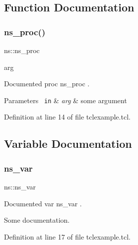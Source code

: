 \subsection{Function Documentation}
\mbox{\label{namespacens_a1429cbe84d32b17ea4783e5c5c00615b}} 
\subsubsection{\texorpdfstring{ns\_proc()}{ns\_proc()}}
{\footnotesize\ttfamily ns\+::ns\+\_\+proc\begin{DoxyParamCaption}\item[{}]{arg  }\end{DoxyParamCaption}}



Documented proc {\ttfamily ns\+\_\+proc} . 


\begin{DoxyParams}[1]{Parameters}
\mbox{\texttt{ in}}  & {\em arg} & some argument \\
\hline
\end{DoxyParams}


Definition at line 14 of file tclexample.\+tcl.


\begin{DoxyCode}{0}

\end{DoxyCode}


\subsection{Variable Documentation}
\mbox{\label{namespacens_a23fe65677d9880119abcb457a677453e}} 
\subsubsection{\texorpdfstring{ns\_var}{ns\_var}}
{\footnotesize\ttfamily ns\+::ns\+\_\+var\hspace{0.3cm}{\ttfamily [static]}}



Documented var {\ttfamily ns\+\_\+var} . 

Some documentation. 

Definition at line 17 of file tclexample.\+tcl.


\begin{DoxyCode}{0}

\end{DoxyCode}

